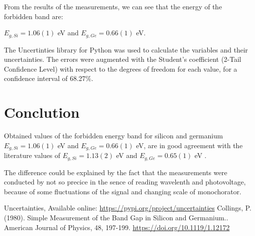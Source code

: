 \documentclass[a4paper,11pt]{article}
\begin{document}
\begin{minipage}[t]{0.5\textwidth}
                \par From the results of the measurements, we can see that the energy of the forbidden band are: 
                \begin{center}
                    $E_{g, Si} = 1.06(1)$ eV and $E_{g, Ge} = 0.66(1)$ eV.
                \end{center}

                \par The Uncertinties library for Python\cite{uncertainties} was used to calculate the variables and their uncertainties. The errors were augmented with the Student's coefficient (2-Tail Confidence Level) with respect to the degrees of freedom for each value, for a confidence interval of 68.27\%.
        
        \section{Conclution} 
                Obtained values of the forbidden energy band for silicon and germanium $E_{g, Si} = 1.06(1)$ eV and $E_{g, Ge} = 0.66(1)$ eV, are in good agreement with the literature values of $E_{g, Si} = 1.13(2)$ eV and $E_{g, Ge} = 0.65(1)$ eV \cite{collings}. 
                \par The difference could be explained by the fact that the measurements were conducted by not so precice in the sence of reading wavelenth and photovoltage, because of some fluctuations of the signal and changing scale of monochorator.

    \end{minipage}
\newpage
                \begin{thebibliography}{9}
                        Uncertainties, Available online: \url{https://pypi.org/project/uncertainties}
                        Collings, P. (1980). Simple Measurement of the Band Gap in Silicon and Germanium.. American Journal of Physics, 48, 197-199. \url{https://doi.org/10.1119/1.12172}
                \end{thebibliography} 
\end{document}
